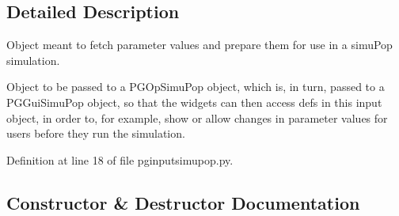 \subsection{Detailed Description}
\begin{DoxyVerb}Object meant to fetch parameter values and prepare them for 
use in a simuPop simulation.  

Object to be passed to a PGOpSimuPop object, which is, in turn,
passed to a PGGuiSimuPop object, so that the widgets can then access
defs in this input object, in order to, for example, show or allow
changes in parameter values for users before they run the simulation.
\end{DoxyVerb}
 

Definition at line 18 of file pginputsimupop.\+py.



\subsection{Constructor \& Destructor Documentation}
